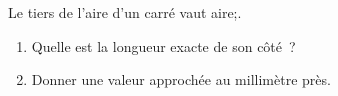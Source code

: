 \documentclass[exercice]{thedocument}%
\begin{document}
%
Le tiers de l'aire d'un carré vaut \<aire;.
\begin{enumerate}
    \item Quelle est la longueur exacte de son côté~?
    \item Donner une valeur approchée au millimètre près.
\end{enumerate}
\end{document}
